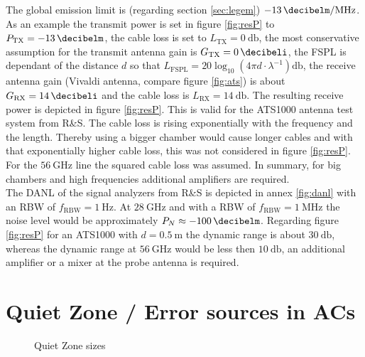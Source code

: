 The global emission limit is (regarding section \ref{sec:legem}) $\SI{-13}{\decibelm\per\mega\hertz}$. As an example the transmit power is set in figure \ref{fig:resP} to $P_{\text{TX}}=\SI{-13}{\decibelm}$, the cable loss is set to $L_{\text{TX}} = \SI{0}{\decibel}$, the most conservative assumption for the transmit antenna gain is $ G_{\text{TX}} = \SI{0}{\decibeli}$, the \ac{FSPL} is dependant of the distance $d$ so that $L_{\text{FSPL}} = 20\log_{10}\left(4\pi d \cdot\lambda^{-1}\right)\si{\decibel}$, the receive antenna gain (Vivaldi antenna, compare figure \ref{fig:ats}) is about $ G_{\text{RX}} = \SI{14}{\decibeli}$ and the cable loss is $L_{\text{RX}}=\SI{14}{\decibel}$. The resulting receive power is depicted in figure \ref{fig:resP}. This is valid for the ATS1000 antenna test system from R\&{}S. The cable loss is rising exponentially with the frequency and the length. Thereby using a bigger chamber would cause longer cables and with that exponentially higher cable loss, this was not considered in figure \ref{fig:resP}. For the $\SI{56}{\giga\hertz}$ line the squared cable loss was assumed. In summary, for big chambers and high frequencies additional amplifiers are required.\\
The \ac{DANL} of the signal analyzers from R\&{}S is depicted in annex \ref{fig:danl} with an \ac{RBW} of $f_{\text{RBW}}=\SI{1}{\hertz}$. At $\SI{28}{\giga\hertz}$ and with a \ac{RBW} of $f_{\text{RBW}}=\SI{1}{\mega\hertz}$ the noise level would be approximately $P_N \approx \SI{-100}{\decibelm}$. Regarding figure \ref{fig:resP} for an ATS1000 with $d=\SI{0.5}{\meter}$ the dynamic range is about $\SI{30}{\decibel}$, whereas the dynamic range at $\SI{56}{\giga\hertz}$ would be less then $\SI{10}{\decibel}$, an additional amplifier or a mixer at the probe antenna is required.

\section{Quiet Zone / Error sources in ACs}

\begin{figure}[h]
  \centering
  \centering
\caption{Quiet Zone sizes}
\label{fig:qz}
\end{figure}

